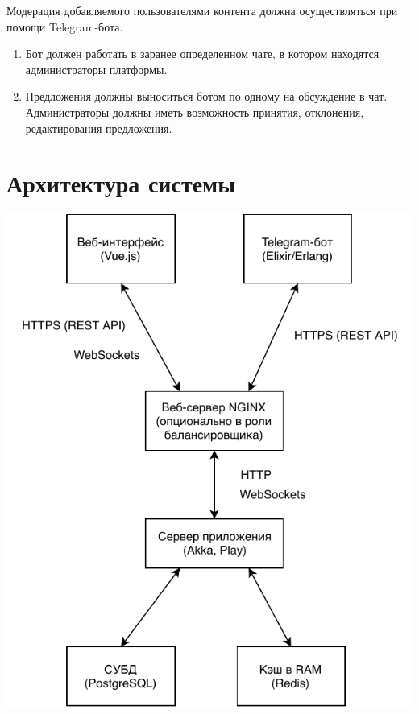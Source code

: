 \documentclass[12pt, a4paper]{article}
\begin{document}
Модерация добавляемого пользователями контента должна осуществляться
при помощи Telegram-бота.

\begin{enumerate}
\item Бот должен работать в заранее определенном чате, в котором находятся администраторы платформы.
\item Предложения должны выноситься ботом по одному на обсуждение в чат. Администраторы должны иметь возможность принятия, отклонения, редактирования предложения. 
\end{enumerate}

\section{Архитектура системы}

\begin{center}
\includegraphics{architecture-overview.pdf}
\end{center}
\end{document}

